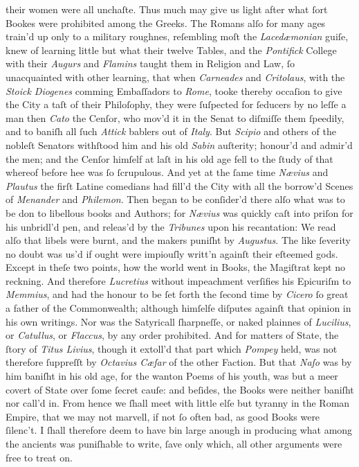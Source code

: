 their women were all unchaſte.  Thus much may give us light after what ſort
Bookes were prohibited among the Greeks.  The Romans alſo for many ages train'd
up only to a military roughnes, reſembling moſt the \textit{Lacedæmonian} guiſe,
knew of learning little but what their twelve Tables, and the \textit{Pontifick}
College with their \textit{Augurs} and \textit{Flamins} taught them in Religion
and Law, ſo unacquainted with other learning, that when \textit{Carneades} and
\textit{Critolaus}, with the \textit{Stoick Diogenes} comming Embaſſadors to
\textit{Rome}, tooke thereby occaſion to give the City a taſt of their
Philoſophy, they were ſuſpected for ſeducers by no leſſe a man then
\textit{Cato} the Cenſor, who mov'd it in the Senat to diſmiſſe them ſpeedily,
and to baniſh all ſuch \textit{Attick} bablers out of \textit{Italy}.  But
\textit{Scipio} and others of the nobleſt Senators withſtood him and his old
\textit{Sabin} auſterity; honour'd and admir'd the men; and the Cenſor himſelf
at laſt in his old age fell to the ſtudy of that whereof before hee was ſo
ſcrupulous.  And yet at the ſame time \textit{Nævius} and \textit{Plautus} the
firſt Latine comedians had fill'd the City with all the borrow'd Scenes of
\textit{Menander} and \textit{Philemon}.  Then began to be conſider'd there alſo
what was to be don to libellous books and Authors; for \textit{Nævius} was
quickly caſt into priſon for his unbridl'd pen, and releas'd by the
\textit{Tribunes} upon his recantation: We read alſo that libels were burnt, and
the makers puniſht by \textit{Augustus}.  The like ſeverity no doubt was us'd if
ought were impiouſly writt'n againſt their eſteemed gods.  Except in theſe two
points, how the world went in Books, the Magiſtrat kept no reckning.  And
therefore \textit{Lucretius} without impeachment verſifies his Epicuriſm to
\textit{Memmius}, and had the honour to be ſet forth the ſecond time by
\textit{Cicero} ſo great a father of the Commonwealth; although himſelfe
diſputes againſt that opinion in his own writings.  Nor was the Satyricall
ſharpneſſe, or naked plainnes of \textit{Lucilius}, or \textit{Catullus}, or
\textit{Flaccus}, by any order prohibited.  And for matters of State, the ſtory
of \textit{Titus Livius}, though it extoll'd that part which \textit{Pompey}
held, was not therefore ſuppreſſt by \textit{Octavius Cæſar} of the other
Faction.  But that \textit{Naſo} was by him baniſht in his old age, for the
wanton Poems of his youth, was but a meer covert of State over ſome ſecret
cauſe: and beſides, the Books were neither baniſht nor call'd in.  From hence we
ſhall meet with little elſe but tyranny in the Roman Empire, that we may not
marvell, if not ſo often bad, as good Books were ſilenc't.  I ſhall therefore
deem to have bin large anough in producing what among the ancients was
puniſhable to write, ſave only which, all other arguments were free to treat on.


